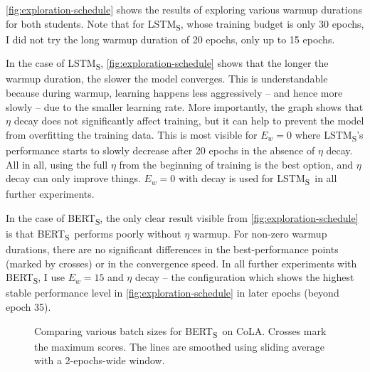 \documentclass[bsc,frontabs,singlespacing,parskip,deptreport]{infthesis}
\def\BERTS{BERT\textsubscript{S}}
\def\LSTMS{LSTM\textsubscript{S}}
\def\sliding{The lines are smoothed using sliding average with a 2-epochs-wide window.}
\begin{document}
{{{      \autoref{fig:exploration-schedule} shows the results of exploring various warmup durations for both students. Note that for \LSTMS, whose training budget is only 30 epochs, I did not try the long warmup duration of 20 epochs, only up to 15 epochs.

      In the case of \LSTMS, \autoref{fig:exploration-schedule} shows that the longer the warmup duration, the slower the model converges. This is understandable because during warmup, learning happens less aggressively -- and hence more slowly -- due to the smaller learning rate. More importantly, the graph shows that $\eta$ decay does not significantly affect training, but it can help to prevent the model from overfitting the training data. This is most visible for $E_w=0$ where \LSTMS's performance starts to slowly decrease after 20 epochs in the absence of $\eta$ decay. All in all, using the full $\eta$ from the beginning of training is the best option, and $\eta$ decay can only improve things. $E_w=0$ with decay is used for \LSTMS~in all further experiments.

      In the case of \BERTS, the only clear result visible from \autoref{fig:exploration-schedule} is that \BERTS~performs poorly without $\eta$ warmup. For non-zero warmup durations, there are no significant differences in the best-performance points (marked by crosses) or in the convergence speed. In all further experiments with \BERTS, I use $E_w=15$ and $\eta$ decay -- the configuration which shows the highest stable performance level in \autoref{fig:exploration-schedule} in later epochs (beyond epoch 35).

      \begin{figure}[h!t]
        \centering
        \caption{Comparing various batch sizes for \BERTS~on CoLA. Crosses mark the maximum scores. \sliding}
        \label{fig:exploration-B-bert}
      \end{figure}

}}}
\end{document}
